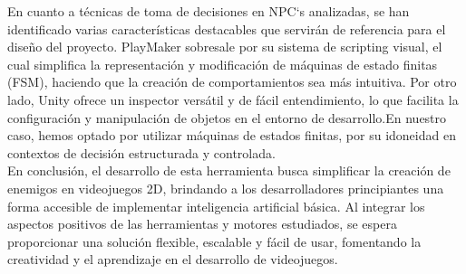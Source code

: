 En cuanto a técnicas de toma de decisiones en NPC`s analizadas, se han identificado varias características destacables que servirán de referencia para el diseño del proyecto. PlayMaker sobresale por su sistema de scripting visual, el cual simplifica la representación y modificación de máquinas de estado finitas (FSM), haciendo que la creación de comportamientos sea más intuitiva. Por otro lado, Unity ofrece un inspector versátil y de fácil entendimiento, lo que facilita la configuración y manipulación de objetos en el entorno de desarrollo.En nuestro caso, hemos optado por utilizar máquinas de estados finitas, por su idoneidad en contextos de decisión estructurada y controlada.\\

En conclusión, el desarrollo de esta herramienta busca simplificar la creación de enemigos en videojuegos 2D, brindando a los desarrolladores principiantes una forma accesible de implementar inteligencia artificial básica. Al integrar los aspectos positivos de las herramientas y motores estudiados, se espera proporcionar una solución flexible, escalable y fácil de usar, fomentando la creatividad y el aprendizaje en el desarrollo de videojuegos.\\